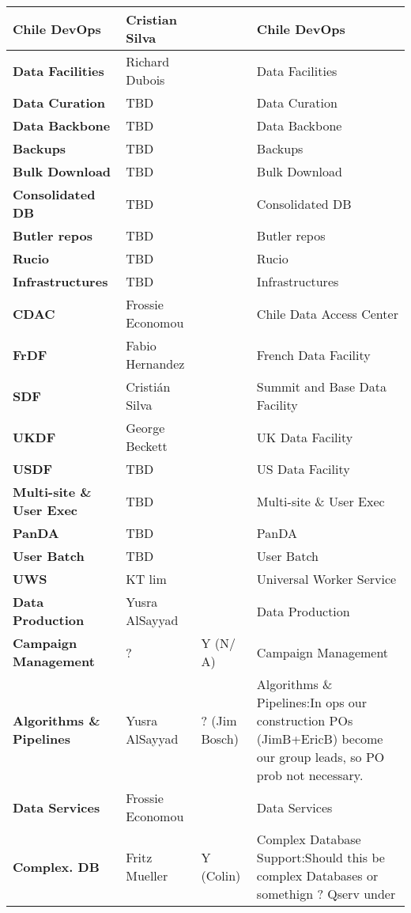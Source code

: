 \begin{longtable} {
|p{}   |p{}|p{} |p{}|}
{\textbf{Chile DevOps}} & Cristian Silva &  & Chile DevOps  \\ \hline
{\textbf{Data Facilities}} & Richard Dubois &  & Data Facilities \\ \hline
{\textbf{Data Curation}} & TBD &  & Data Curation \\ \hline
{\textbf{Data Backbone}} & TBD &  & Data Backbone \\ \hline
{\textbf{Backups}} & TBD &  & Backups \\ \hline
{\textbf{Bulk Download}} & TBD &  & Bulk Download \\ \hline
{\textbf{Consolidated DB}} & TBD &  & Consolidated DB \\ \hline
{\textbf{Butler repos}} & TBD &  & Butler repos \\ \hline
{\textbf{Rucio}} & TBD &  & Rucio \\ \hline
{\textbf{Infrastructures}} & TBD &  & Infrastructures \\ \hline
{\textbf{CDAC}} & Frossie Economou &  & Chile Data Access Center \\ \hline
{\textbf{FrDF}} & Fabio Hernandez &  & French Data Facility \\ \hline
{\textbf{SDF}} & Cristián Silva &  & Summit and Base Data Facility \\ \hline
{\textbf{UKDF}} & George Beckett &  & UK Data Facility \\ \hline
{\textbf{USDF}} & TBD &  & US Data Facility \\ \hline
{\textbf{Multi-site \&  User Exec}} & TBD &  & Multi-site \&  User Exec \\ \hline
{\textbf{PanDA}} & TBD &  & PanDA \\ \hline
{\textbf{User Batch}} & TBD &  & User Batch \\ \hline
{\textbf{UWS}} & KT lim &  & Universal Worker Service \\ \hline
{\textbf{Data Production}} & Yusra AlSayyad &  & Data Production \\ \hline
{\textbf{Campaign Management}} & ? & Y (N/ A) & Campaign Management \\ \hline
{\textbf{Algorithms \&  Pipelines}} & Yusra AlSayyad & ? (Jim Bosch) & Algorithms \&  Pipelines:In ops our construction POs (JimB+EricB) become our group leads, so PO prob not necessary. \\ \hline
{\textbf{Data Services}} & Frossie Economou &  & Data Services \\ \hline
{\textbf{Complex. DB}} & Fritz Mueller & Y (Colin) & Complex Database Support:Should this be complex Databases or somethign ? Qserv under \\ \hline

\end{longtable}
